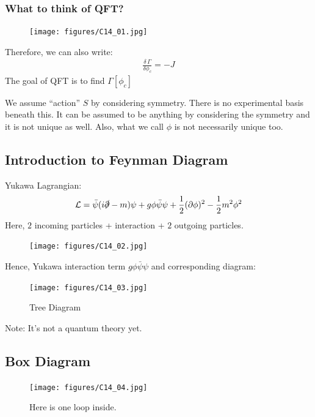 \documentclass[14pt]{article} %
\begin{document}
\subsubsection*{What to think of QFT?}
\vspace{-0.5cm}
\begin{figure}[H]
    \centering
    \texttt{[image: figures/C14\_01.jpg]}
    \caption*{}
\end{figure}
\vspace{-1.2cm}
Therefore, we can also write:
\begin{align*}
\frac{\delta \,\Gamma}{\delta \phi_c} = -J
\end{align*}
The goal of QFT is to find $\Gamma[\phi_c]$
\begin{tcolorbox}
We assume ``action'' $S$ by considering symmetry. There is no experimental basis beneath this. It can be assumed to be anything by considering the symmetry and it is not unique as well. Also, what we call $\phi$ is not necessarily unique too.
\end{tcolorbox}

\subsection{Introduction to Feynman Diagram}
Yukawa Lagrangian:
\begin{align*}
\mathcal{L} = \bar{\psi}(i \slashed{\partial} - m)\psi + g \phi \bar{\psi} \psi + \frac{1}{2} (\partial \phi)^2 - \frac{1}{2} m^2 \phi^2
\end{align*}
Here, $2$ incoming particles + interaction + $2$ outgoing particles.
\begin{figure}[H]
    \centering
    \texttt{[image: figures/C14\_02.jpg]}
    \caption*{}
\end{figure}
\vspace{-0.5cm}
Hence, Yukawa interaction term $g \phi \bar{\psi} \psi$ and corresponding diagram:
\begin{figure}[H]
    \centering
    \texttt{[image: figures/C14\_03.jpg]}
    \caption*{Tree Diagram}
\end{figure}
\vspace{-0.5cm}
\begin{center}
    Note: It's not a quantum theory yet.
\end{center}

\subsection{Box Diagram}
\vspace{-0.5cm}
\begin{figure}[H]
    \centering
    \texttt{[image: figures/C14\_04.jpg]}
    \caption*{Here is one loop inside.}
\end{figure}
\vspace{-0.5cm}
\end{document}
